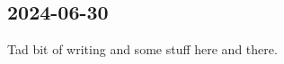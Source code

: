 \subsection{2024-06-30} %
\label{subsec:2024-06-30}

Tad bit of writing and some stuff here and there.

